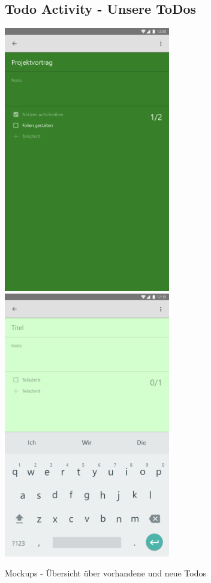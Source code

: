 \begin{figure}[H]
	\subsection*{Todo Activity - Unsere ToDos}
	\centering
	\includegraphics[width=7.25cm]{img/ToDoActivity.pdf}
	\includegraphics[width=7.25cm]{img/ToDoActivityNew.pdf}
	\caption{Mockups - Übersicht über vorhandene und neue Todos}
	\label{img:ToDoActivity}
\end{figure}


